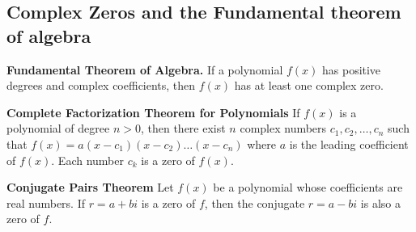 \documentclass{report}
\begin{document}
    \pagebreak \bigbreak \noindent
    \subsection{Complex Zeros and the Fundamental theorem of algebra}
    \bigbreak \noindent 
    \begin{mdframed}
      \textbf{Fundamental Theorem of Algebra.}
      \bigbreak \noindent 
      If a polynomial $f(x)$ has positive degrees and complex coefficients, then $f(x)$ has at least one complex zero.
    \end{mdframed}
    \bigbreak \noindent 
    \begin{mdframed}
      \textbf{Complete Factorization Theorem for Polynomials}
      \bigbreak \noindent 
      If $f(x)$ is a polynomial of degree $n>0$, then there exist $n$ complex numbers $c_1, c_2, \dots, c_n$ such that $f(x) = a(x-c_1)(x-c_2)\dots(x-c_n)$ where $a$ is the leading coefficient of $f(x)$. Each number $c_k$ is a zero of $f(x)$.
    \end{mdframed}

    \bigbreak \noindent 
    \begin{mdframed}
      \textbf{Conjugate Pairs Theorem}
      \bigbreak \noindent 
      Let $f(x)$ be a polynomial whose coefficients are real numbers. If $r=a+bi$ is a zero of $f$, then the conjugate $r=a-bi$ is also a zero of $f$.
    \end{mdframed}
    \bigbreak \noindent 
    \bigbreak \noindent 
\end{document}
